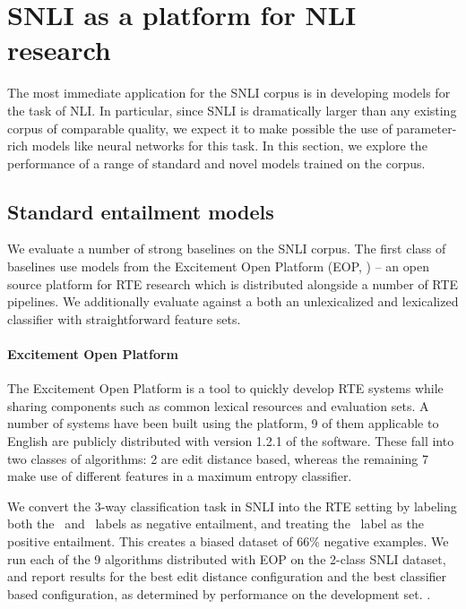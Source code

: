 \section{SNLI as a platform for NLI research}

The most immediate application for the SNLI corpus is in developing models for the task of NLI. In particular, since SNLI is dramatically larger than any existing corpus of comparable quality, we expect it to make possible the use of parameter-rich models like neural networks for this task. In this section, we explore the performance of a range of standard and novel models trained on the corpus.

\subsection{Standard entailment models}
We evaluate a number of strong baselines on the SNLI corpus.
The first class of baselines use models from the Excitement Open
  Platform (EOP,
  \citealt{pado2014design,magnini2014excitement})
  -- an open source platform for RTE research which
  is distributed alongside a number of RTE pipelines.
We additionally evaluate against a both an unlexicalized and lexicalized
  classifier with straightforward feature sets.


%
%
\paragraph{Excitement Open Platform}
The Excitement Open Platform is a tool to quickly develop RTE systems
  while sharing components such as common lexical resources and 
  evaluation sets.
A number of systems have been built using the platform, 9 of them
  applicable to English are publicly distributed with version 1.2.1
  of the software.
These fall into two classes of algorithms: 2 are edit distance based,
  whereas the remaining 7 make use of different features in a
  maximum entropy classifier.

We convert the 3-way classification task in SNLI into the RTE setting
  by labeling both the \unknown\ and \contradiction\
  labels as negative entailment, and treating the \entailment\ label as
  the positive entailment.
This creates a biased dataset of 66\% negative examples.
We run each of the 9 algorithms distributed with EOP on the 2-class
  SNLI dataset, and report results for the best edit distance 
  configuration and the best classifier based configuration, as
  determined by performance on the development set.
.

